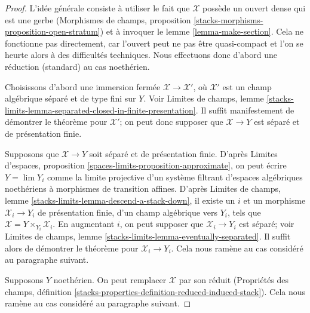\begin{proof}
L'idée générale consiste à utiliser le fait que $\mathcal{X}$ possède un ouvert dense
qui est une gerbe (Morphismes de champs, proposition
\ref{stacks-morphisms-proposition-open-stratum})
et à invoquer le lemme \ref{lemma-make-section}.
Cela ne fonctionne pas directement, car l'ouvert peut ne pas être
quasi-compact et l'on se heurte alors à des difficultés techniques. Nous effectuons donc
d'abord une réduction (standard) au cas noethérien.

\medskip\noindent
Choisissons d'abord une immersion fermée
$\mathcal{X} \to \mathcal{X}'$, où $\mathcal{X}'$
est un champ algébrique séparé et de type fini sur $Y$.
Voir Limites de champs, lemme
\ref{stacks-limits-lemma-separated-closed-in-finite-presentation}.
Il suffit manifestement de démontrer le théorème pour
$\mathcal{X}'$; on peut donc supposer que $\mathcal{X} \to Y$
est séparé et de présentation finie.

\medskip\noindent
Supposons que $\mathcal{X} \to Y$ soit séparé et de présentation finie.
D'après Limites d'espaces, proposition \ref{spaces-limits-proposition-approximate},
on peut écrire $Y = \lim Y_i$ comme la limite projective d'un système filtrant
d'espaces algébriques noethériens à morphismes de transition affines.
D'après Limites de champs, lemme \ref{stacks-limits-lemma-descend-a-stack-down},
il existe un $i$ et un morphisme $\mathcal{X}_i \to Y_i$ de présentation finie,
d'un champ algébrique vers $Y_i$, tels que
$\mathcal{X} = Y \times_{Y_i} \mathcal{X}_i$.
En augmentant $i$, on peut supposer que $\mathcal{X}_i \to Y_i$
est séparé; voir Limites de champs, lemme
\ref{stacks-limits-lemma-eventually-separated}.
Il suffit alors de démontrer le théorème
pour $\mathcal{X}_i \to Y_i$. Cela nous ramène au cas considéré
au paragraphe suivant.

\medskip\noindent
Supposons $Y$ noethérien. On peut remplacer $\mathcal{X}$ par son
réduit (Propriétés des champs, définition
\ref{stacks-properties-definition-reduced-induced-stack}).
Cela nous ramène au cas considéré
au paragraphe suivant.


\end{proof}
